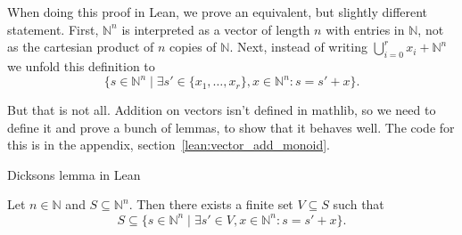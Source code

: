 \documentclass[a4paper, 12pt]{article}
\newcommand{\N}{\mathbb{N}}
\theoremstyle{changedot}
\theoremstyle{changedotbreak}
\theoremstyle{nonumberplain}
\begin{document}
When doing this proof in Lean, we prove an equivalent, but slightly different statement. First, $\N^{n}$ is interpreted as a vector of length $n$ with entries in $\N$, not as the cartesian product of $n$ copies of $\N$. Next, instead of writing $\bigcup_{i=0}^{r} x_{i} + \N^{n}$ we unfold this definition to
\[\{s \in \N^{n} \mid \exists s' \in \{x_{1}, \dots, x_{r}\}, x \in \N^{n} : s = s' + x\}.\]

But that is not all. Addition on vectors isn't defined in mathlib, so we need to define it and prove a bunch of lemmas, to show that it behaves well. The code for this is in the appendix, section~\ref{lean:vector_add_monoid}.



\begin{lemma} Dicksons lemma in Lean

  Let $n \in \N$ and $S \subseteq \N^{n}$. Then there exists a finite set $V \subseteq S$ such that \[S \subseteq \{s \in \N^{n} \mid \exists s' \in V, x \in \N^{n} : s = s' + x\}.\]

\end{lemma}
\end{document}
